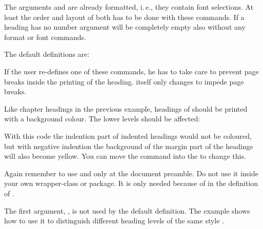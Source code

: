 The arguments  and  are already formatted, i.\,e.,
they contain font selections. At least the order and layout of both has to be
done with these commands. If a heading has no number argument 
will be completely empty also without any format or font commands.

The default definitions are:
\begin{lstcode}[belowskip=\dp\strutbox plus 1pt]
\newcommand{\sectionlinesformat}[4]{%
  \@hangfrom{\hskip #2#3}{#4}%
}
\newcommand{\sectioncatchphraseformat}[4]{%
  \hskip #2#3#4%
}
\end{lstcode}

If the user re-defines one of these commands, he has to take care to prevent
page breaks inside the printing of the heading. \KOMAScript{} itself only
changes  to impede page breaks.

\begin{Example}
  Like chapter headings in the previous example, headings of 
   should be printed with a background colour. The lower
  levels should be affected:
\begin{lstcode}
  \makeatletter
  \renewcommand{\sectionlinesformat}[4]{%
    \@tempswafalse
    \ifstr{#1}{section}{%
      \hspace*{#2}%
      \colorbox{yellow}{%
        \parbox{\dimexpr\linewidth-2\fboxrule-2\fboxsep-#2}{%
          \raggedsection
          \@hangfrom{#3}{#4}%
        }%
      }%
    }{%
      \@hangfrom{\hskip #2#3}{#4}%
    }%
  }
  \makeatother
\end{lstcode}
  With this code the indention part of indented headings would not be
  coloured, but with negative indention the background of the margin part of
  the headings will also become yellow. You can move the 
  command into the  to change this.

  Again remember to use  and  only at the
  document preamble. Do not use it inside your own wrapper-class or
  package. It is only needed because of  in the definition of
  .
\end{Example}

The first argument, , is not used by the default definition. The
example shows how to use it to distinguish different heading levels of the
same style .%
%
%


